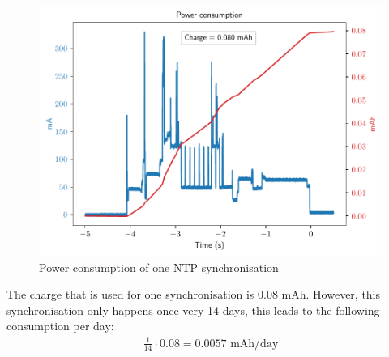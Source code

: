 \documentclass[11pt,a4paper]{article}
\begin{document}
\begin{figure}[H]
	\centering
	\includegraphics[width=1.0\linewidth]{sync_pwr.pdf}
	\caption{Power consumption of one NTP synchronisation}
	\label{fig:ntp_pwr}
\end{figure}

The charge that is used for one synchronisation is 0.08 mAh. However, this synchronisation only happens once very 14 days, this leads to the following consumption per day:
\begin{gather*}
	\frac{1}{14} \cdot 0.08 = 0.0057 \text{ mAh/day}
\end{gather*}
\end{document}
